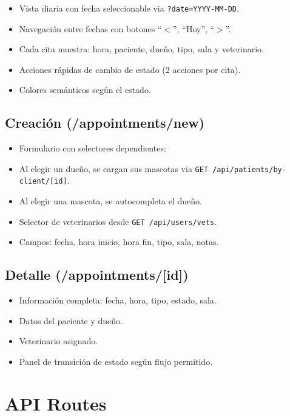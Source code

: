 \begin{itemize}[leftmargin=*]
    \item Vista diaria con fecha seleccionable via \texttt{?date=YYYY-MM-DD}.
    \item Navegaci\'on entre fechas con botones ``$<$'', ``Hoy'', ``$>$''.
    \item Cada cita muestra: hora, paciente, due\~no, tipo, sala y veterinario.
    \item Acciones r\'apidas de cambio de estado (2 acciones por cita).
    \item Colores sem\'anticos seg\'un el estado.
\end{itemize}

\subsection{Creaci\'on (/appointments/new)}

\begin{itemize}[leftmargin=*]
    \item Formulario con selectores dependientes:
    \item Al elegir un due\~no, se cargan sus mascotas via
          \texttt{GET /api/patients/by-client/[id]}.
    \item Al elegir una mascota, se autocompleta el due\~no.
    \item Selector de veterinarios desde \texttt{GET /api/users/vets}.
    \item Campos: fecha, hora inicio, hora fin, tipo, sala, notas.
\end{itemize}

\subsection{Detalle (/appointments/[id])}

\begin{itemize}[leftmargin=*]
    \item Informaci\'on completa: fecha, hora, tipo, estado, sala.
    \item Datos del paciente y due\~no.
    \item Veterinario asignado.
    \item Panel de transici\'on de estado seg\'un flujo permitido.
\end{itemize}

\section{API Routes}

